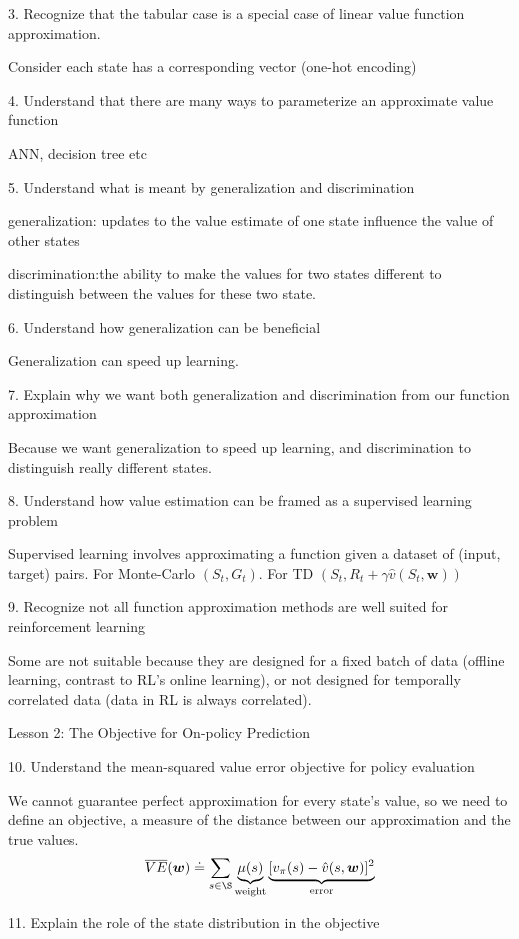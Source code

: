 \documentclass[sutton_barto_notes.tex]{subfiles}
\begin{document}
3. Recognize that the tabular case is a special case of linear value function approximation. 

Consider each state has a corresponding vector (one-hot encoding)

4. Understand that there are many ways to parameterize an approximate value function 

ANN, decision tree etc

5. Understand what is meant by generalization and discrimination 

generalization: updates to the value estimate of one state influence the value of other states

discrimination:the ability to make the values for two states different to distinguish between the values for these two state.

6. Understand how generalization can be beneficial 

Generalization can speed up learning.

7. Explain why we want both generalization and discrimination from our function approximation 

Because we want generalization to speed up learning, and discrimination to distinguish really different states.

8. Understand how value estimation can be framed as a supervised learning problem 

Supervised learning involves approximating a function given a dataset of (input, target) pairs. For Monte-Carlo $(S_t, G_t)$. For TD $(S_t, R_t+\gamma\hat{v}(S_t, \bm{w}))$

9. Recognize not all function approximation methods are well suited for reinforcement learning 

Some are not suitable because they are designed for a fixed batch of data (offline learning, contrast to RL's online learning), or not designed for temporally correlated data (data in RL is always correlated).

Lesson 2: The Objective for On-policy Prediction 

10. Understand the mean-squared value error objective for policy evaluation 

We cannot guarantee perfect approximation for every state's value, so we need to define an objective, a measure of the distance between our approximation and the true values.
$$\overline{VE}(\bm{w}) \doteq \sum_{s\in\S} \underbrace{\mu(s)}_{\text{weight}} \underbrace{[v_\pi(s) - \hat{v}(s,\bm{w})]^2}_{\text{error}}$$

11. Explain the role of the state distribution in the objective 
\end{document}
